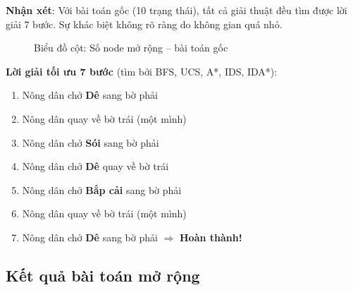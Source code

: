 \documentclass[a4paper,12pt]{article}
\begin{document}
\textbf{Nhận xét}: Với bài toán gốc (10 trạng thái), tất cả giải thuật đều tìm được lời giải 7 bước. Sự khác biệt không rõ ràng do không gian quá nhỏ.

\begin{figure}[H]
\centering
{}
\caption{Biểu đồ cột: Số node mở rộng -- bài toán gốc}
\label{fig:bar_orig_nodes}
\end{figure}

\textbf{Lời giải tối ưu 7 bước} (tìm bởi BFS, UCS, A*, IDS, IDA*):
\begin{enumerate}
    \item Nông dân chở \textbf{Dê} sang bờ phải
    \item Nông dân quay về bờ trái (một mình)
    \item Nông dân chở \textbf{Sói} sang bờ phải
    \item Nông dân chở \textbf{Dê} quay về bờ trái
    \item Nông dân chở \textbf{Bắp cải} sang bờ phải
    \item Nông dân quay về bờ trái (một mình)
    \item Nông dân chở \textbf{Dê} sang bờ phải $\Rightarrow$ \textbf{Hoàn thành!}
\end{enumerate}

\subsection{Kết quả bài toán mở rộng}
\end{document}
